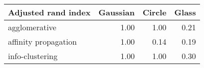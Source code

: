 \begin{tabular}{lrrr}
\hline
 Adjusted rand index   &   Gaussian &   Circle &   Glass \\
\hline
 agglomerative         &       1.00 &     1.00 &    0.21 \\
 affinity propagation  &       1.00 &     0.14 &    0.19 \\
 info-clustering       &       1.00 &     1.00 &    0.30 \\
\hline
\end{tabular}